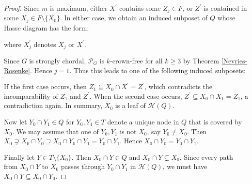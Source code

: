 \documentclass[ALCO, Unicode,published]{cedram}
\newcommand{\mcH}{\mathcal{H}}
\begin{document}
\begin{proof}
Since $ m $ is maximum, either $ X^{\prime} $ contains some $ Z_{j} \in F$, or $ Z^{\prime} $ is contained in some  $ X_{j} \in F \setminus \{X_0\}$. 
In either case, we obtain an induced subposet of $Q$ whose Hasse diagram has the form: 
\begin{center}
\end{center}
where $ X_{j}^{\prime} $ denotes $ X_{j} $ or $ X^{\prime} $.

Since $ G $ is strongly chordal, $ \mathcal{P}_{G} $ is $ k $-crown-free for all $ k \geq 3 $ by Theorem \ref{Nevries-Rosenke}. 
Hence $ j = 1 $. 
Thus this leads to one of the following induced subposets: 
\begin{center}
\hspace{7mm} \hspace{7mm}
\end{center}

If the first case occurs, then $ Z_{1} \subseteq X_{0} \cap X^{\prime} = Z^{\prime} $, which contradicts the incomparability of $ Z_{1} $ and $ Z^{\prime} $. 
When the second case occurs, $ Z^{\prime} \subseteq X_{0} \cap X_{1} = Z_{1} $, a contradiction again. 
In summary, $ X_{0} $ is a leaf of $\mcH(Q)$. 

Now let $ Y_{0} \cap Y_{1} \in Q$  for $Y_{0}, Y_{1} \in T$ denote a unique node in $ Q $ that is covered by~$ X_{0} $. 
We may assume that one of $Y_{0}, Y_{1}$ is not $X_0$, say $ Y_{0} \neq X_{0} $.
Then $ X_{0} \supsetneq X_{0} \cap Y_{0} \supseteq X_{0} \cap Y_{0} \cap Y_{1} = Y_{0} \cap Y_{1} $. 
Hence $ X_{0} \cap Y_{0} = Y_{0} \cap Y_{1} $. 

Finally let $ Y \in T\setminus\{X_{0}\} $. 
Then $ X_{0} \cap Y \in Q $ and $ X_{0} \cap Y \subsetneq X_{0} $. 
Since every path from $ X_{0} \cap Y $ to $ X_{0} $ passes through $   Y_{0} \cap Y_{1} $ in $\mcH(Q)$, we must have $ X_{0} \cap Y \subseteq X_{0} \cap Y_{0} $. 
\end{proof}
\end{document}
